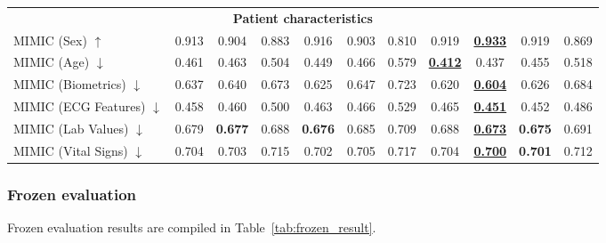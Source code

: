 \documentclass{article}
\begin{document}
\begin{table}[t]
\begin{tabular}{lcccccccccc}
                    \multicolumn{11}{c}{\textbf{Patient characteristics}} \\
                    MIMIC (Sex) $\uparrow$ & 0.913 & 0.904 & 0.883 & 0.916 & 0.903 & 0.810 & 0.919 & \textbf{\underline{0.933}} & 0.919 & 0.869 \\
                    
                    MIMIC (Age) $\downarrow$ & 0.461 & 0.463 & 0.504 & 0.449 & 0.466 & 0.579 & \textbf{\underline{0.412}} & 0.437 & 0.455 & 0.518 \\
                    MIMIC (Biometrics) $\downarrow$ & 0.637 & 0.640 & 0.673 & 0.625 & 0.647 & 0.723 & 0.620 & \textbf{\underline{0.604}} & 0.626 & 0.684 \\
                    MIMIC (ECG Features) $\downarrow$ & 0.458 & 0.460 & 0.500 & 0.463 & 0.466 & 0.529 & 0.465 & \textbf{\underline{0.451}} & 0.452 & 0.486 \\
                    MIMIC (Lab Values) $\downarrow$ & 0.679 & \textbf{0.677} & 0.688 & \textbf{0.676} & 0.685 & 0.709 & 0.688 & \textbf{\underline{0.673}} & \textbf{0.675} & 0.691 \\
                    MIMIC (Vital Signs) $\downarrow$ & 0.704 & 0.703 & 0.715 & 0.702 & 0.705 & 0.717 & 0.704 & \textbf{\underline{0.700}} & \textbf{0.701} & 0.712 \\
                    
                    \bottomrule
                \end{tabular}
            \end{table}


            \subsubsection{Frozen evaluation}
            Frozen evaluation results are compiled in Table~\ref{tab:frozen_result}.
\end{document}
